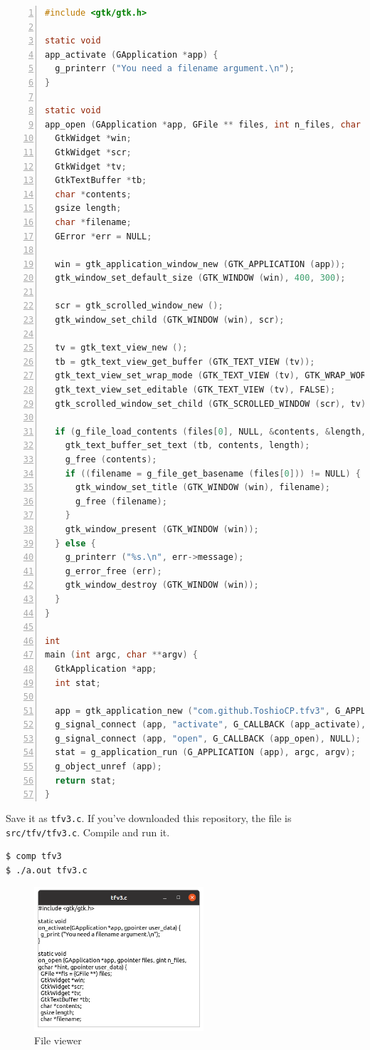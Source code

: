 \begin{lstlisting}[language=C, numbers=left]
#include <gtk/gtk.h>

static void
app_activate (GApplication *app) {
  g_printerr ("You need a filename argument.\n");
}

static void
app_open (GApplication *app, GFile ** files, int n_files, char *hint) {
  GtkWidget *win;
  GtkWidget *scr;
  GtkWidget *tv;
  GtkTextBuffer *tb;
  char *contents;
  gsize length;
  char *filename;
  GError *err = NULL;

  win = gtk_application_window_new (GTK_APPLICATION (app));
  gtk_window_set_default_size (GTK_WINDOW (win), 400, 300);

  scr = gtk_scrolled_window_new ();
  gtk_window_set_child (GTK_WINDOW (win), scr);

  tv = gtk_text_view_new ();
  tb = gtk_text_view_get_buffer (GTK_TEXT_VIEW (tv));
  gtk_text_view_set_wrap_mode (GTK_TEXT_VIEW (tv), GTK_WRAP_WORD_CHAR);
  gtk_text_view_set_editable (GTK_TEXT_VIEW (tv), FALSE);
  gtk_scrolled_window_set_child (GTK_SCROLLED_WINDOW (scr), tv);

  if (g_file_load_contents (files[0], NULL, &contents, &length, NULL, &err)) {
    gtk_text_buffer_set_text (tb, contents, length);
    g_free (contents);
    if ((filename = g_file_get_basename (files[0])) != NULL) {
      gtk_window_set_title (GTK_WINDOW (win), filename);
      g_free (filename);
    }
    gtk_window_present (GTK_WINDOW (win));
  } else {
    g_printerr ("%s.\n", err->message);
    g_error_free (err);
    gtk_window_destroy (GTK_WINDOW (win));
  }
}

int
main (int argc, char **argv) {
  GtkApplication *app;
  int stat;

  app = gtk_application_new ("com.github.ToshioCP.tfv3", G_APPLICATION_HANDLES_OPEN);
  g_signal_connect (app, "activate", G_CALLBACK (app_activate), NULL);
  g_signal_connect (app, "open", G_CALLBACK (app_open), NULL);
  stat = g_application_run (G_APPLICATION (app), argc, argv);
  g_object_unref (app);
  return stat;
}
\end{lstlisting}

Save it as \passthrough{\lstinline!tfv3.c!}. If you've downloaded this
repository, the file is \passthrough{\lstinline!src/tfv/tfv3.c!}.
Compile and run it.

\begin{lstlisting}
$ comp tfv3
$ ./a.out tfv3.c
\end{lstlisting}

\begin{figure}
\centering
\includegraphics[width=6.3cm,height=5.325cm]{../image/screenshot_tfv3.png}
\caption{File viewer}
\end{figure}

